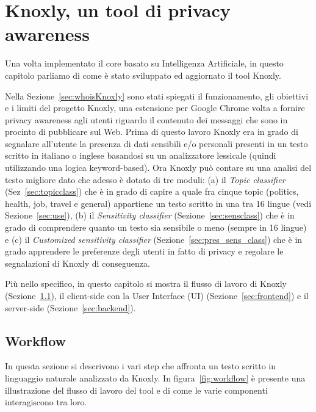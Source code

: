 \chapter{Knoxly, un tool di privacy awareness}
Una volta implementato il core basato su Intelligenza Artificiale, in questo capitolo parliamo di come è stato sviluppato ed aggiornato il tool Knoxly.
 
Nella Sezione~\ref{sec:whoisKnoxly} sono stati spiegati il funzionamento, gli obiettivi e i limiti del progetto Knoxly, una estensione per Google Chrome volta a fornire privacy awareness agli utenti riguardo il contenuto dei messaggi che sono in procinto di pubblicare sul Web. Prima di questo lavoro Knoxly era in grado di segnalare all'utente la presenza di dati sensibili e/o personali presenti in un testo scritto in italiano o inglese basandosi su un analizzatore lessicale (quindi utilizzando una logica keyword-based). Ora Knoxly può contare su una analisi del testo migliore dato che adesso è dotato di tre moduli: (a) il \textit{Topic classifier} (Sez~\ref{sec:topicclass}) che è in grado di capire a quale fra cinque topic (politics, health, job, travel e general) appartiene un testo scritto in una tra 16 lingue (vedi Sezione~\ref{sec:use}), (b) il \textit{Sensitivity classifier} (Sezione~\ref{sec:sensclass}) che è in grado di comprendere quanto un testo sia sensibile o meno (sempre in 16 lingue) e (c) il \textit{Customized sensitivity classifier} (Sezione~\ref{sec:pres_sens_class}) che è in grado apprendere le preferenze degli utenti in fatto di privacy e regolare le segnalazioni di Knoxly di conseguenza.

Più nello specifico, in questo capitolo si mostra il flusso di lavoro di Knoxly (Sezione~\ref{sec:workflow}), il client-side con la User Interface (UI) (Sezione~\ref{sec:frontend}) e il server-side (Sezione~\ref{sec:backend}).

\section{Workflow}
\label{sec:workflow}
In questa sezione si descrivono i vari step che affronta un testo scritto in linguaggio naturale analizzato da Knoxly. In figura~\ref{fig:workflow} è presente una illustrazione del flusso di lavoro del tool e di come le varie componenti interagiscono tra loro.

